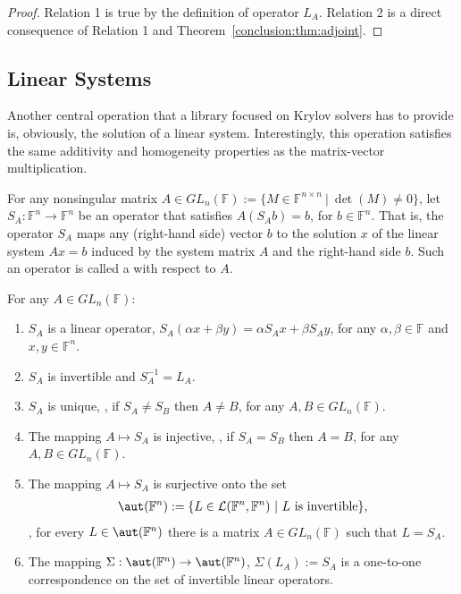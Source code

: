 \begin{proof}
Relation 1 is true by the definition of operator $L_A$. Relation 2 is a direct
consequence of Relation 1 and Theorem~\ref{conclusion:thm:adjoint}.
\end{proof}

\subsection{Linear Systems}
\label{conclusion:ssec:systems}

Another central operation that a library focused on Krylov solvers has to
provide is, obviously, the solution of a linear system. Interestingly, this
operation satisfies the same additivity and homogeneity properties as the
matrix-vector multiplication.

\begin{definition}
\label{conclusion:def:solver-linop}
For any nonsingular matrix $A \in GL_n(\mathbb{F}) := \lbrace M \in
\mathbb{F}^{n \times n} \ \vert \ \det(M) \neq 0 \rbrace$, let $S_A :
\mathbb{F}^n \rightarrow \mathbb{F}^n$ be an operator that satisfies $A(S_Ab) =
b$, for $b \in \mathbb{F}^n$. That is, the operator $S_A$ maps any (right-hand
side) vector $b$ to the solution $x$ of the linear system $Ax = b$ induced by
the system matrix $A$ and the right-hand side $b$. Such an operator is called a
 with respect to $A$.
\end{definition}

\begin{theorem}
\label{conclusion:thm:solver-linop}
For any $A \in GL_n(\mathbb{F})$:
\begin{enumerate}
\item $S_A$ is a linear operator, \ie $S_A(\alpha x + \beta y) = \alpha S_A x +
\beta S_A y$, for any $\alpha,\beta \in \mathbb{F}$ and $x, y \in \mathbb{F}^n$.
\item $S_A$ is invertible and $S_A^{-1} = L_A^{}$.
\item $S_A$ is unique, \ie, if $S_A \neq S_B$ then $A \neq B$, for any $A, B
\in GL_n(\mathbb{F})$.
\item The mapping $A \mapsto S_A$ is injective, \ie, if $S_A = S_B$ then $A
= B$, for any $A, B \in GL_n(\mathbb{F})$.
\item The mapping $A \mapsto S_A$ is surjective onto the set
\begin{align}
\aut(\mathbb{F}^n) := \lbrace L \in \mathcal{L}(\mathbb{F}^n, \mathbb{F}^n) \
\vert \ L \text{ is invertible} \rbrace,
\end{align}
\ie, for every $L \in \aut(\mathbb{F}^n)$ there is a matrix $A \in
GL_n(\mathbb{F})$ such that $L = S_A$.
\item The mapping $\Sigma : \aut(\mathbb{F}^n) \rightarrow \aut(\mathbb{F}^n)$,
$\Sigma(L_A) := S_A$ is a one-to-one correspondence on the set of invertible
linear operators.
\end{enumerate}
\end{theorem}

